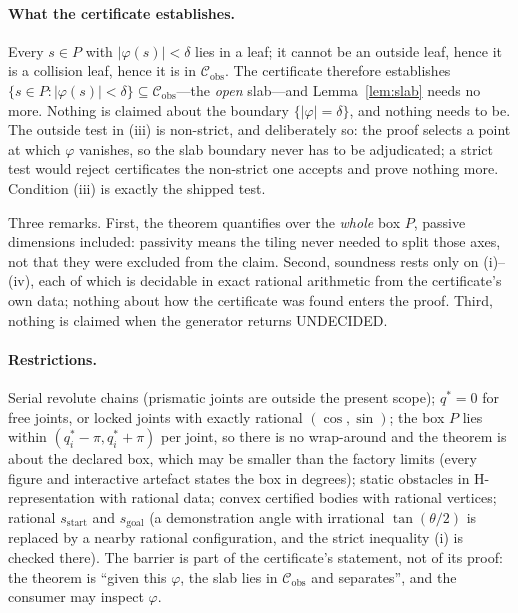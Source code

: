 \documentclass[10pt,twocolumn,letterpaper]{article}
\newcommand{\Cobs}{\mathcal{C}_{\mathrm{obs}}}
\newcommand{\vphi}{\varphi}
\begin{document}
\paragraph{What the certificate establishes.} Every $s\in P$ with $|\vphi(s)|<\delta$ lies in a leaf; it cannot be an outside leaf, hence it is a collision leaf, hence it is in $\Cobs$. The certificate therefore establishes $\{s\in P:|\vphi(s)|<\delta\}\subseteq\Cobs$---the \emph{open} slab---and Lemma~\ref{lem:slab} needs no more. Nothing is claimed about the boundary $\{|\vphi|=\delta\}$, and nothing needs to be. The outside test in (iii) is non-strict, and deliberately so: the proof selects a point at which $\vphi$ vanishes, so the slab boundary never has to be adjudicated; a strict test would reject certificates the non-strict one accepts and prove nothing more. Condition (iii) is exactly the shipped test.

Three remarks. First, the theorem quantifies over the \emph{whole} box $P$, passive dimensions included: passivity means the tiling never needed to split those axes, not that they were excluded from the claim. Second, soundness rests only on (i)--(iv), each of which is decidable in exact rational arithmetic from the certificate's own data; nothing about how the certificate was found enters the proof. Third, nothing is claimed when the generator returns UNDECIDED.

\paragraph{Restrictions.} Serial revolute chains (prismatic joints are outside the present scope); $q^*=0$ for free joints, or locked joints with exactly rational $(\cos,\sin)$; the box $P$ lies within $(q^*_i-\pi,q^*_i+\pi)$ per joint, so there is no wrap-around and the theorem is about the declared box, which may be smaller than the factory limits (every figure and interactive artefact states the box in degrees); static obstacles in H-representation with rational data; convex certified bodies with rational vertices; rational $s_{\mathrm{start}}$ and $s_{\mathrm{goal}}$ (a demonstration angle with irrational $\tan(\theta/2)$ is replaced by a nearby rational configuration, and the strict inequality (i) is checked there). The barrier is part of the certificate's statement, not of its proof: the theorem is ``given this $\vphi$, the slab lies in $\Cobs$ and separates'', and the consumer may inspect $\vphi$.
\end{document}
